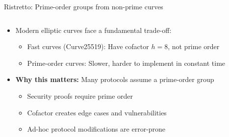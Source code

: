 \documentclass[aspectratio=169, lualatex, handout]{beamer}
\begin{document}
\begin{frame}{Ristretto: Prime-order groups from non-prime curves}
	\begin{columns}[c]
		\begin{column}{1\textwidth}
			\begin{itemize}
				\item Modern elliptic curves face a fundamental trade-off:
				      \begin{itemize}
					      \item Fast curves (Curve25519): Have cofactor $h = 8$, not prime order
					      \item Prime-order curves: Slower, harder to implement in constant time
				      \end{itemize}
				\item \textbf{Why this matters:} Many protocols assume a prime-order group
				      \begin{itemize}
					      \item Security proofs require prime order
					      \item Cofactor creates edge cases and vulnerabilities
					      \item Ad-hoc protocol modifications are error-prone
				      \end{itemize}
			\end{itemize}
		\end{column}
	\end{columns}
\end{frame}
\end{document}
